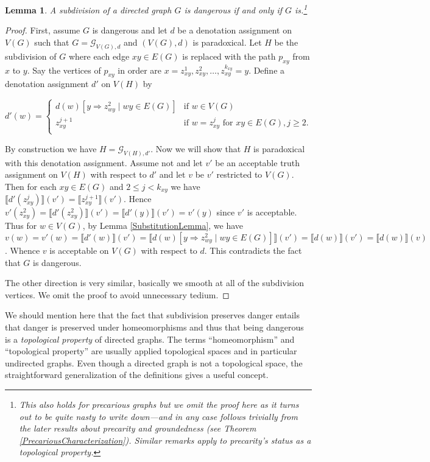 \documentclass[12pt]{kluwer}
\newtheorem{lem}[thm]{Lemma}
\theoremstyle{remark}
\newcommand{\fancy}[1]{\mathcal{#1}}
\def\G{\fancy{G}}
\begin{document}
\begin{lem}\label{SubdivisionLemma}
A subdivision of a directed graph $G$ is dangerous if and only if $G$ is.\footnote{This also holds for precarious graphs but we omit the proof here as it turns out to be quite nasty to write down---and in any case follows trivially from the later results about precarity and groundedness (see Theorem \ref{PrecariousCharacterization}). Similar remarks apply to precarity's status as a topological property.}
\end{lem}
\begin{proof}
First, assume $G$ is dangerous and let $d$ be a denotation assignment on $V(G)$ such that $G = \G_{V(G), d}$ and $(V(G), d)$ is paradoxical.  Let $H$ be the subdivision of $G$ where each edge $xy \in E(G)$ is replaced with the path $p_{xy}$ from $x$ to $y$.  Say the vertices of $p_{xy}$ in order are $x = z_{xy}^1, z_{xy}^2, \ldots, z_{xy}^{k_{xy}} = y$.  Define a denotation assignment $d'$ on $V(H)$ by

\[d'(w) = \begin{cases}
d(w)[y \Rightarrow z_{wy}^2 \mid wy \in E(G)] & \text{if } w \in V(G) \\
z_{xy}^{j+1} & \text{if } w = z_{xy}^j \text{ for } xy \in E(G), j \geq 2. \\
\end{cases}\]

By construction we have $H = \G_{V(H), d'}$.  Now we will show that $H$ is paradoxical with this denotation assignment.  Assume not and let $v'$ be an acceptable truth assignment on $V(H)$ with respect to $d'$ and let $v$ be $v'$ restricted to $V(G)$. Then for each $xy \in E(G)$ and $2 \leq j < k_{xy}$ we have $\llbracket d'(z_{xy}^j) \rrbracket(v') = \llbracket z_{xy}^{j + 1} \rrbracket(v')$.  Hence $v'(z_{xy}^2) = \llbracket d'(z_{xy}^2) \rrbracket(v') = \llbracket d'(y) \rrbracket(v') = v'(y)$ since $v'$ is acceptable.  Thus for $w \in V(G)$, by Lemma \ref{SubstitutionLemma}, we have $v(w) = v'(w) = \llbracket d'(w) \rrbracket(v') = \llbracket d(w)[y \Rightarrow z_{wy}^2 \mid wy \in E(G)] \rrbracket(v') = \llbracket d(w) \rrbracket(v') = \llbracket d(w) \rrbracket(v)$.  Whence $v$ is acceptable on $V(G)$ with respect to $d$.  This contradicts the fact that $G$ is dangerous.

The other direction is very similar, basically we smooth at all of the subdivision vertices.  We omit the proof to avoid unnecessary tedium.
\end{proof}

We should mention here that the fact that subdivision preserves danger entails that danger is preserved under homeomorphisms and thus that being dangerous is a \textit{topological property} of directed graphs.  The terms ``homeomorphism'' and ``topological property'' are usually applied topological spaces and in particular undirected graphs.  Even though a directed graph is not a topological space, the straightforward generalization of the definitions gives a useful concept.
\end{document}
